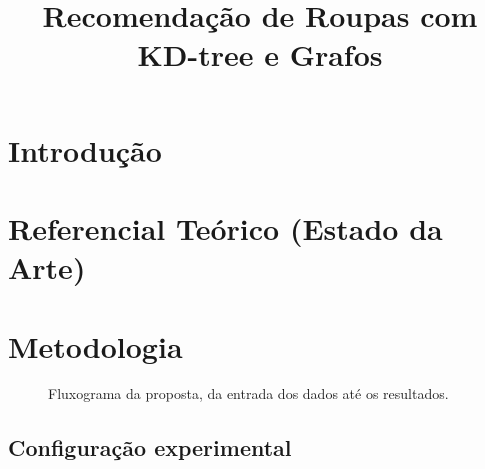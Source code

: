 \documentclass[conference]{IEEEtran}
\begin{document}
\title{Recomendação de Roupas com KD-tree e Grafos}

\author{
\and
{}
\and
{}
}

\maketitle

\begin{abstract}

\end{abstract}

\begin{IEEEkeywords}

\end{IEEEkeywords}

\section{Introdução}


\section{Referencial Teórico (Estado da Arte)}


\section{Metodologia}


\begin{figure}[t]
\centering
\resizebox{\columnwidth}{!}{}
\caption{Fluxograma da proposta, da entrada dos dados até os resultados.}
\label{fig:fluxo}
\end{figure}

\subsection{Configuração experimental}

\end{document}
